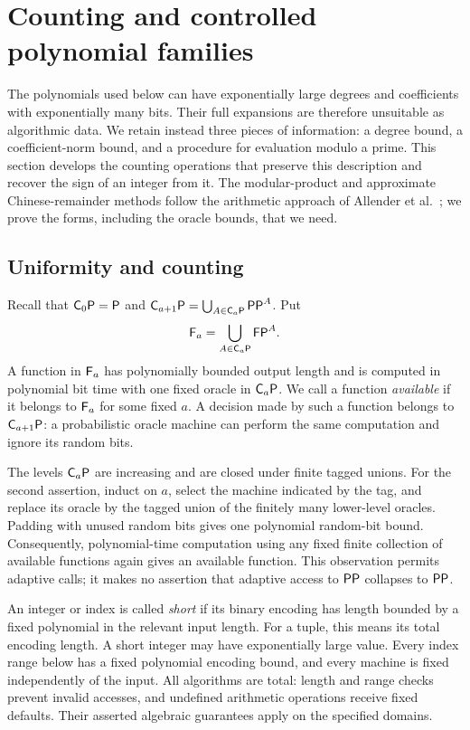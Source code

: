 \section{Counting and controlled polynomial families}\label{sec:counting}

The polynomials used below can have exponentially large degrees and
coefficients with exponentially many bits.  Their full expansions are
therefore unsuitable as algorithmic data.  We retain instead three
pieces of information: a degree bound, a coefficient-norm bound, and a
procedure for evaluation modulo a prime.  This section develops the
counting operations that preserve this description and recover the sign
of an integer from it.  The modular-product and approximate
Chinese-remainder methods follow the arithmetic approach of
Allender et al.~\cite[Section~4]{AllenderBurgisserKjeldgaardPedersenMiltersen2009};
we prove the forms, including the oracle bounds, that we need.

\subsection{Uniformity and counting}

Recall that $\mathsf C_{0}\mathsf P=\mathsf P$ and
$\mathsf C_{a+1}\mathsf P=\bigcup_{A\in\mathsf C_{a}\mathsf P}\mathsf{PP}^A$.  Put
\[
 \mathsf F_{a}=\bigcup_{A\in\mathsf C_{a}\mathsf P}\mathsf{FP}^A.
\]
A function in $\mathsf F_{a}$ has polynomially bounded output length and is
computed in polynomial bit time with one fixed oracle in $\mathsf C_{a}\mathsf P$.
We call a function \emph{available} if it belongs to $\mathsf F_{a}$ for
some fixed $a$.  A decision made by such a function belongs to
$\mathsf C_{a+1}\mathsf P$: a probabilistic oracle machine can perform the same
computation and ignore its random bits.

The levels $\mathsf C_{a}\mathsf P$ are increasing and are closed under finite tagged
unions.  For the second assertion, induct on $a$, select the machine
indicated by the tag, and replace its oracle by the tagged union of the
finitely many lower-level oracles.  Padding with unused random bits
gives one polynomial random-bit bound.  Consequently, polynomial-time
computation using any fixed finite collection of available functions
again gives an available function.  This observation permits adaptive
calls; it makes no assertion that adaptive access to $\mathsf{PP}$ collapses to
$\mathsf{PP}$.

An integer or index is called \emph{short} if its binary encoding has
length bounded by a fixed polynomial in the relevant input length.
For a tuple, this means its total encoding length.  A short integer may
have exponentially large value.  Every index range below has a fixed
polynomial encoding bound, and every machine is fixed independently of
the input.  All algorithms are total: length and range checks prevent invalid
accesses, and undefined arithmetic operations receive fixed defaults.
Their asserted algebraic guarantees apply on the specified domains.

